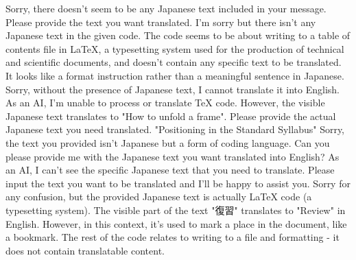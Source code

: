 Sorry, there doesn't seem to be any Japanese text included in your message. Please provide the text you want translated.
I'm sorry but there isn't any Japanese text in the given code. The code seems to be about writing to a table of contents file in LaTeX, a typesetting system used for the production of technical and scientific documents, and doesn't contain any specific text to be translated. It looks like a format instruction rather than a meaningful sentence in Japanese.
Sorry, without the presence of Japanese text, I cannot translate it into English.
As an AI, I'm unable to process or translate TeX code. However, the visible Japanese text translates to "How to unfold a frame". Please provide the actual Japanese text you need translated.
"Positioning in the Standard Syllabus"
Sorry, the text you provided isn't Japanese but a form of coding language. Can you please provide me with the Japanese text you want translated into English?
As an AI, I can't see the specific Japanese text that you need to translate. Please input the text you want to be translated and I'll be happy to assist you.
Sorry for any confusion, but the provided Japanese text is actually LaTeX code (a typesetting system). The visible part of the text "復習" translates to "Review" in English. However, in this context, it's used to mark a place in the document, like a bookmark. The rest of the code relates to writing to a file and formatting - it does not contain translatable content.
